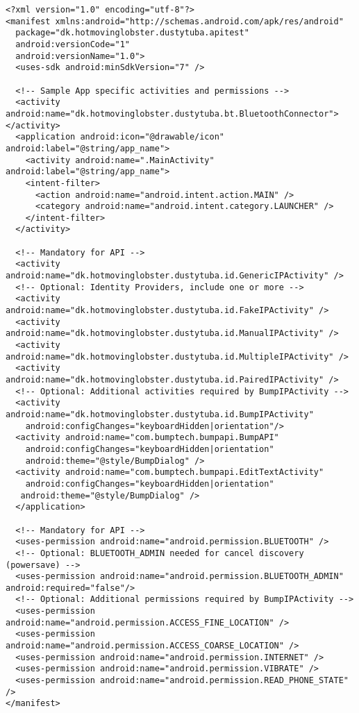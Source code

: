 \documentclass[a4paper,11pt]{article}
\begin{document}
\footnotesize
\begin{verbatim}
<?xml version="1.0" encoding="utf-8"?>
<manifest xmlns:android="http://schemas.android.com/apk/res/android"
  package="dk.hotmovinglobster.dustytuba.apitest"
  android:versionCode="1"
  android:versionName="1.0">
  <uses-sdk android:minSdkVersion="7" />

  <!-- Sample App specific activities and permissions -->
  <activity android:name="dk.hotmovinglobster.dustytuba.bt.BluetoothConnector"></activity>
  <application android:icon="@drawable/icon" android:label="@string/app_name">
    <activity android:name=".MainActivity" android:label="@string/app_name">
    <intent-filter>
      <action android:name="android.intent.action.MAIN" />
      <category android:name="android.intent.category.LAUNCHER" />
    </intent-filter>
  </activity>
  
  <!-- Mandatory for API -->
  <activity android:name="dk.hotmovinglobster.dustytuba.id.GenericIPActivity" />
  <!-- Optional: Identity Providers, include one or more -->
  <activity android:name="dk.hotmovinglobster.dustytuba.id.FakeIPActivity" />
  <activity android:name="dk.hotmovinglobster.dustytuba.id.ManualIPActivity" />
  <activity android:name="dk.hotmovinglobster.dustytuba.id.MultipleIPActivity" />
  <activity android:name="dk.hotmovinglobster.dustytuba.id.PairedIPActivity" />
  <!-- Optional: Additional activities required by BumpIPActivity -->
  <activity android:name="dk.hotmovinglobster.dustytuba.id.BumpIPActivity"
    android:configChanges="keyboardHidden|orientation"/>
  <activity android:name="com.bumptech.bumpapi.BumpAPI"
    android:configChanges="keyboardHidden|orientation"
    android:theme="@style/BumpDialog" />
  <activity android:name="com.bumptech.bumpapi.EditTextActivity"
    android:configChanges="keyboardHidden|orientation"
   android:theme="@style/BumpDialog" />
  </application>
  
  <!-- Mandatory for API -->
  <uses-permission android:name="android.permission.BLUETOOTH" />
  <!-- Optional: BLUETOOTH_ADMIN needed for cancel discovery (powersave) -->
  <uses-permission android:name="android.permission.BLUETOOTH_ADMIN" android:required="false"/>
  <!-- Optional: Additional permissions required by BumpIPActivity -->
  <uses-permission android:name="android.permission.ACCESS_FINE_LOCATION" />
  <uses-permission android:name="android.permission.ACCESS_COARSE_LOCATION" />
  <uses-permission android:name="android.permission.INTERNET" />
  <uses-permission android:name="android.permission.VIBRATE" />
  <uses-permission android:name="android.permission.READ_PHONE_STATE" />
</manifest>
\end{verbatim}
\normalsize
\end{document}
